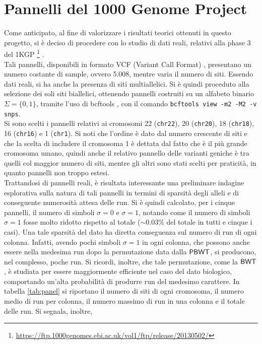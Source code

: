 \section{Pannelli del 1000 Genome Project}
Come anticipato, al fine di valorizzare i risultati teorici ottenuti in
questo progetto, si 
è deciso di procedere con lo studio di dati reali, relativi alla phase
  3 del 1KGP
\footnote{\url{https://ftp.1000genomes.ebi.ac.uk/vol1/ftp/release/20130502/}}
\cite{1kgp}.\\ 
Tali pannelli, disponibili in formato VCF (Variant Call Format) \cite{vcf},
presentano un numero 
costante di sample, ovvero 5.008, mentre varia il numero di siti. Essendo
dati reali, si ha anche la presenza di siti multiallelici. Si è quindi proceduto
alla selezione dei soli siti biallelici, ottenendo pannelli costruiti su
un alfabeto binario $\Sigma=\{0,1\}$, tramite l'uso di bcftools
\cite{bcftools}, con il comando \texttt{bcftools view -m2 -M2
  -v snps}.\\
Si sono scelti i pannelli relativi ai cromosomi 22 (\texttt{chr22}), 20
(\texttt{chr20}), 18 (\texttt{chr18}), 16 (\texttt{chr16}) e 1 (\texttt{chr1}).
Si noti che  
l'ordine è dato dal numero crescente di siti e che la scelta di includere il
cromosoma 1 è dettata dal fatto che è il più grande cromosoma
umano, quindi  anche il relativo pannello delle varianti geniche
è tra quelli col maggior numero di siti, mentre gli altri sono stati scelti
per praticità, in quanto pannelli non troppo estesi.\\
Trattandosi di pannelli reali, è risultata interessante una preliminare
indagine esplorativa sulla natura di tali pannelli in termini di
sparsità degli alleli e di conseguente numerosità attesa delle run. Si è
quindi calcolato, per i cinque pannelli, il numero di simboli $\sigma=0$ e
$\sigma=1$, notando come il numero di simboli $\sigma=1$ fosse molto ridotto
rispetto al totale ($\sim 0.03\%$ del totale in tutti e
cinque i casi). Una tale
sparsità del dato ha diretta conseguenza sul numero di run di ogni
colonna. Infatti, avendo 
pochi simboli $\sigma=1$ in ogni colonna, che possono anche
essere nella medesima run dopo la permutazione data dalla
$\mbox{\rm {\sf PBWT}}$, si producono, nel complesso, poche run. Si ricordi, inoltre, che tale
permutazione, come la 
$\mbox{\rm {\sf BWT}}$, è studiata per essere 
maggiormente efficiente nel caso del dato biologico, comportando un'alta
probabilità di produrre run del medesimo carattere. In tabella \ref{tab:panel}
si riportano il numero di siti di ogni cromosoma, il 
numero medio di run per colonna, il numero 
massimo di run in una colonna e il totale delle run. Si segnala, inoltre,
